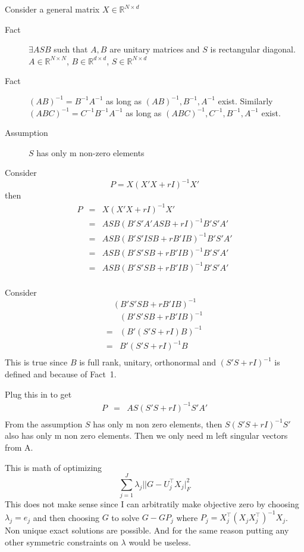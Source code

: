 \documentclass[11pt]{article}
\begin{document}
\raggedright
Consider a general matrix $X \in \mathbb{R}^{N \times d}$
\begin{description}
\item[Fact] $\exists A S B$ such that $A, B$ are unitary matrices and $S$ is
  rectangular diagonal. $A \in \mathbb{R}^{N \times N}$, $B \in
  \mathbb{R}^{d \times d}$, $S \in \mathbb{R}^{N \times d}$
\item[Fact] $(AB)^{-1} = B^{-1}A^{-1}$ as long as $(AB)^{-1}, B^{-1},
  A^{-1}$ exist. Similarly $(ABC)^{-1} = C^{-1}B^{-1}A^{-1}$ as long
  as $(ABC)^{-1}, C^{-1}, B^{-1}, A^{-1}$ exist.
\item[Assumption] $S$ has only m non-zero elements
\end{description}
Consider $$P = X(X'X+rI)^{-1}X'$$ then
\begin{eqnarray}
  P &=& X(X'X+rI)^{-1}X'\\
  &=&  ASB(B'S'A'ASB + rI)^{-1}B'S'A'\\
  &=&  ASB(B'S'ISB + rB'IB)^{-1}B'S'A'\\
  &=&  ASB(B'S'SB + rB'IB)^{-1}B'S'A'\\
  &=&  ASB(B'S'SB + rB'IB)^{-1}B'S'A'\\
\end{eqnarray}

Consider $$(B'S'SB + rB'IB)^{-1}$$
\begin{eqnarray*}
  &(B'S'SB + rB'IB)^{-1}\\
  =& (B'(S'S + rI)B)^{-1}\\
  =& B'(S'S + rI)^{-1}B\\
\end{eqnarray*}
This is true since $B$ is full rank, unitary, orthonormal and $(S'S +
rI)^{-1}$ is defined and because of Fact~1.

Plug this in to get
\begin{eqnarray}
  P &=& AS(S'S + rI)^{-1}S'A'\\
\end{eqnarray}
From the assumption $S$ has only m non zero elements, then $S(S'S +
rI)^{-1}S'$ also has only m non zero elements. Then we only need m
left singular vectors from A.

\newpage
This is math of optimizing
$$\sum_{j = 1}^J \lambda_j ||G - U_j^\top X_j |^2_F $$
This does not make sense since I can arbitratily make objective zero
by choosing $\lambda_j = e_j$ and then choosing $G$ to solve $G -
GP_j$ where $P_j = X_j^\top(X_jX_j^\top)^{-1}X_j$. Non unique exact
solutions are possible. And for the same reason putting any other
symmetric constraints on $\lambda$ would be useless.
\end{document}
